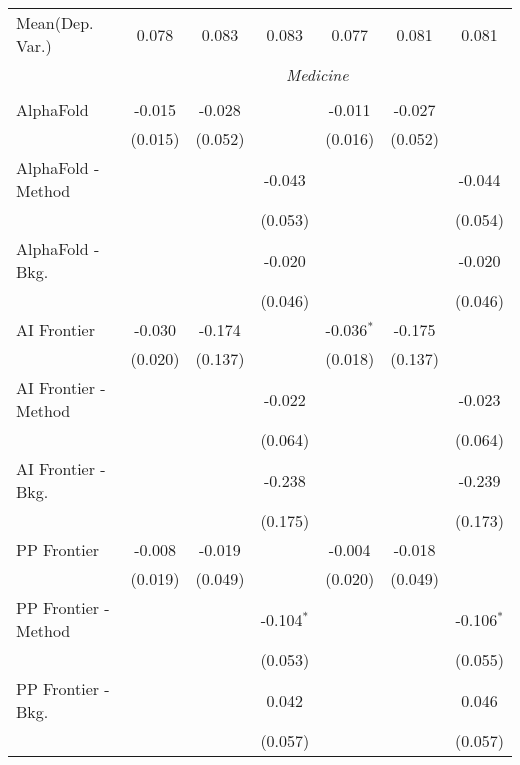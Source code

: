 \begin{tabular}{lcccccc}
Mean(Dep. Var.) & 0.078 & 0.083 & 0.083 & 0.077 & 0.081 & 0.081 \\
 & \multicolumn{6}{c}{\textit{Medicine}} \\ \\
   AlphaFold            & -0.015  & -0.028  &              & -0.011       & -0.027  &   \\   
                        & (0.015) & (0.052) &              & (0.016)      & (0.052) &   \\   
   AlphaFold - Method   &         &         & -0.043       &              &         & -0.044\\   
                        &         &         & (0.053)      &              &         & (0.054)\\   
   AlphaFold - Bkg.     &         &         & -0.020       &              &         & -0.020\\   
                        &         &         & (0.046)      &              &         & (0.046)\\   
   AI Frontier          & -0.030  & -0.174  &              & -0.036$^{*}$ & -0.175  &   \\   
                        & (0.020) & (0.137) &              & (0.018)      & (0.137) &   \\   
   AI Frontier - Method &         &         & -0.022       &              &         & -0.023\\   
                        &         &         & (0.064)      &              &         & (0.064)\\   
   AI Frontier - Bkg.   &         &         & -0.238       &              &         & -0.239\\   
                        &         &         & (0.175)      &              &         & (0.173)\\   
   PP Frontier          & -0.008  & -0.019  &              & -0.004       & -0.018  &   \\   
                        & (0.019) & (0.049) &              & (0.020)      & (0.049) &   \\   
   PP Frontier - Method &         &         & -0.104$^{*}$ &              &         & -0.106$^{*}$\\   
                        &         &         & (0.053)      &              &         & (0.055)\\   
   PP Frontier - Bkg.   &         &         & 0.042        &              &         & 0.046\\   
                        &         &         & (0.057)      &              &         & (0.057)\\   

\end{tabular}
